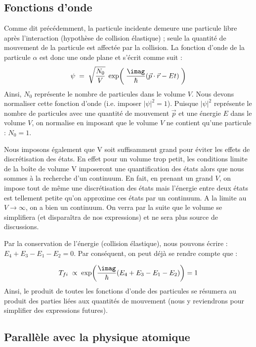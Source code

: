 \subsection{Fonctions d'onde}\label{fct_onde}


Comme dit précédemment, la particule incidente demeure une particule libre après l'interaction (hypothèse de collision élastique) ; seule la quantité de mouvement de la particule est affectée par la collision. La fonction d'onde de la particule $\alpha$ est donc une onde plane et s'écrit comme suit :
\[
    \psi \eq \sqrt{\dfrac{N_0}{V}} \; \exp( \;\dfrac{\imag}{\hbar}(\vec{p}\cdot\vec{r} - Et) \; )
\]
Ainsi, $N_0$ représente le nombre de particules dans le volume $V$.
Nous devons normaliser cette fonction d'onde (i.e. imposer $|\psi|^2 = 1$). Puisque $|\psi|^2$ représente le nombre de particules avec une quantité de mouvement $\vec{p}$ et une énergie $E$ dans le volume $V$, on normalise en imposant que le volume $V$ ne contient qu'une particule : $N_0 = 1$.

Nous imposons également que V soit suffisamment grand pour éviter les effets de discrétisation des états. En effet pour un volume trop petit, les conditions limite de la boîte de volume V imposeront une quantification des états alors que nous sommes à la recherche d'un continuum. En fait, en prenant un grand $V$, on impose tout de même une discrétisation des états mais l'énergie entre deux états est tellement petite qu'on approxime ces états par un continuum. A la limite au $V \rightarrow \infty$, on a bien un continuum. On verra par la suite que le volume se simplifiera (et disparaîtra de nos expressions) et ne sera plus source de discussions.

Par la conservation de l'énergie (collision élastique), nous pouvons écrire : $E_4 + E_3 - E_1 - E_2 = 0$. Par conséquent, on peut déjà se rendre compte que :

\[
    T_{fi} \; \propto \; \exp(\dfrac{\imag}{\hbar} (E_4 + E_3 - E_1 - E_2)) = 1
\]
Ainsi, le produit de toutes les fonctions d'onde des particules se résumera au produit des parties liées aux quantités de mouvement (nous y reviendrons pour simplifier des expressions futures).


\subsection{Parallèle avec la physique atomique}

